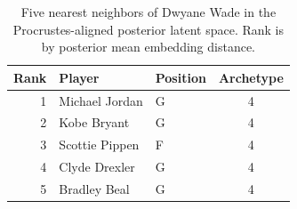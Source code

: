 \begin{table}[htbp]
  \centering\small
  \begin{tabular}{rllc}
    \toprule
    Rank & Player & Position & Archetype \\
    \midrule
    1 & Michael Jordan & G & 4 \\
    2 & Kobe Bryant & G & 4 \\
    3 & Scottie Pippen & F & 4 \\
    4 & Clyde Drexler & G & 4 \\
    5 & Bradley Beal & G & 4 \\
    \bottomrule
  \end{tabular}
  \caption{Five nearest neighbors of Dwyane Wade in the Procrustes-aligned posterior latent space. Rank is by posterior mean embedding distance.}
  \label{tab:Dwyane_Wade_neighbors}
\end{table}

